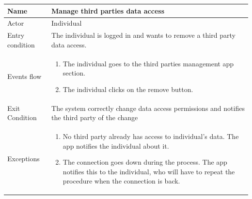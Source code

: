 \begin{tabular}{|l|p{11cm}|}
    \hline
    Name & Manage third parties data access
    \\ \hline
    Actor & Individual
    \\ \hline 
    Entry condition & The individual is logged in and wants to remove a third party data access.
        \\ \hline
    Events flow &
    \begin{enumerate}
	\item The individual goes to the third parties management app section.
    \item The individual clicks on the remove button.
    \end{enumerate}
     \\ \hline
     Exit Condition & The system correctly change data access permissions and notifies the third party of the change
     \\
    \hline
    Exceptions &
        \begin{enumerate}
    \item No third party already has access to individual's data. The app notifies the individual about it.
    \item The connection goes down during the process. The app notifies this to the individual, who will have to repeat the procedure when the connection is back.
    \end{enumerate}
       \\
    \hline
\end{tabular}



